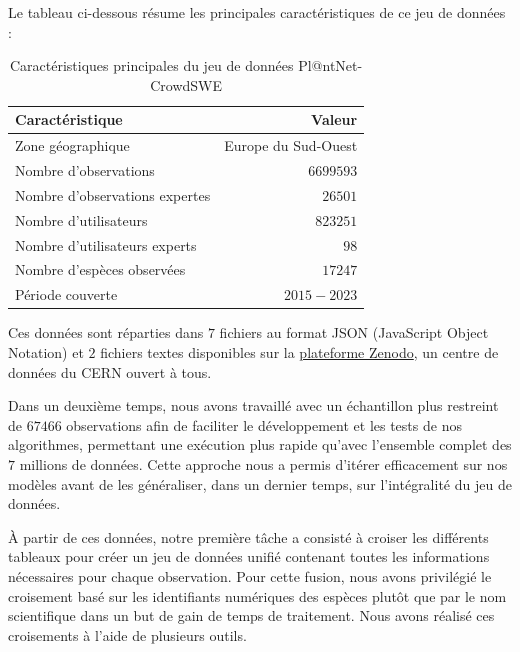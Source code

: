 \documentclass[a4paper,12pt]{article}
\begin{document}
\vspace{0.2cm}

Le tableau ci-dessous résume les principales caractéristiques de ce jeu de données :

\vspace{0.2cm}

\begin{table}[H]
\centering
\begin{tabular}{|l|r|}
    \hline
    \textbf{Caractéristique} & \textbf{Valeur} \\
    \hline
    Zone géographique  & Europe du Sud-Ouest  \\
    Nombre d'observations & $\num{6 699 593}$  \\
    Nombre d'observations expertes & $\num{26 501}$ \\
    Nombre d'utilisateurs  & $\num{823 251}$  \\
    Nombre d'utilisateurs experts  & $98$  \\
    Nombre d'espèces observées  & $\num{17 247}$  \\
    Période couverte  & $2015-2023$  \\
    \hline
    \end{tabular}
\caption{Caractéristiques principales du jeu de données Pl@ntNet-CrowdSWE}
\label{tab:recap des caractéristiques}
\end{table}
    
\vspace{0.2cm}

Ces données sont réparties dans $7$ fichiers au format JSON (JavaScript Object Notation) et $2$ fichiers textes disponibles sur la \href{https://zenodo.org/records/10782465}{plateforme Zenodo}, un centre de données du CERN ouvert à tous.

\vspace{0.2cm}

Dans un deuxième temps, nous avons travaillé avec un échantillon plus restreint de $\num{67 466}$ observations afin de faciliter le développement et les tests de nos algorithmes, permettant une exécution plus rapide qu'avec l'ensemble complet des $7$ millions de données. Cette approche nous a permis d'itérer efficacement sur nos modèles avant de les généraliser, dans un dernier temps, sur l'intégralité du jeu de données.

\vspace{0.2cm}

À partir de ces données, notre première tâche a consisté à croiser les différents tableaux pour créer un jeu de données unifié contenant toutes les informations nécessaires pour chaque observation. Pour cette fusion, nous avons privilégié le croisement basé sur les identifiants numériques des espèces plutôt que par le nom scientifique dans un but de gain de temps de traitement. Nous avons réalisé ces croisements à l'aide de plusieurs outils.
\end{document}
